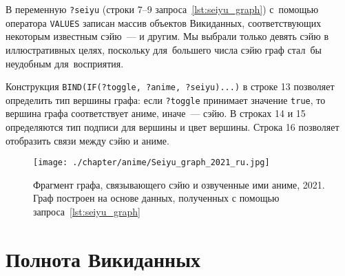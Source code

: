 В переменную \lstinline|?seiyu| (строки 7--9 запроса~\ref{lst:seiyu_graph}) 
с~помощью оператора \lstinline|VALUES| 
записан массив объектов Викиданных, 
соответствующих некоторым известным сэйю~---  и другим. 
Мы выбрали только девять сэйю в иллюстративных целях, 
поскольку для~большего числа сэйю граф стал~бы неудобным для~восприятия.

Конструкция \lstinline|BIND(IF(?toggle, ?anime, ?seiyu)...)| в строке \num{13} 
позволяет определить тип вершины графа: 
если \lstinline|?toggle| принимает значение \lstinline|true|, 
то вершина графа соответствует аниме, иначе~--- сэйю. 
В строках 14 и 15 определяются тип подписи для вершины и цвет вершины. 
Строка 16 позволяет отобразить связи между сэйю и аниме.

\newpage
\begin{figure*}[h!]
	\texttt{[image: ./chapter/anime/Seiyu\_graph\_2021\_ru.jpg]}\centering
	\caption[Граф сэйю и аниме, 2021 год.]{Фрагмент графа, связывающего сэйю и озвученные ими аниме, 2021.\\Граф построен на основе данных, полученных с помощью запроса~\protect\ref{lst:seiyu_graph}}%
      \label{fig:Seiyu_graph_2021_ru}%
\end{figure*} 




\section{Полнота Викиданных}

